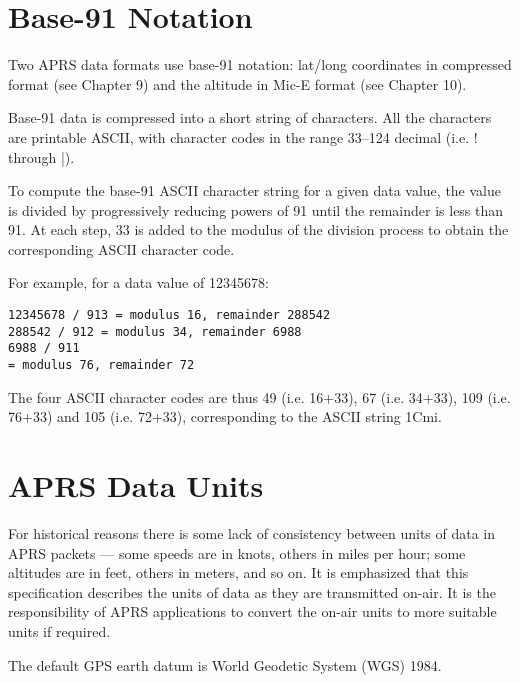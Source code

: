 \section{Base-91 Notation}

Two APRS data formats use base-91 notation: lat/long coordinates in
compressed format (see Chapter 9) and the altitude in Mic-E format (see
Chapter 10).

Base-91 data is compressed into a short string of characters. All the
characters are printable ASCII, with character codes in the range 33–124
decimal (i.e. ! through |).

To compute the base-91 ASCII character string for a given data value, the
value is divided by progressively reducing powers of 91 until the remainder
is less than 91. At each step, 33 is added to the modulus of the division
process to obtain the corresponding ASCII character code.

For example, for a data value of 12345678:
\begin{verbatim}
12345678 / 913 = modulus 16, remainder 288542
288542 / 912 = modulus 34, remainder 6988
6988 / 911
= modulus 76, remainder 72
\end{verbatim}

The four ASCII character codes are thus 49 (i.e. 16+33), 67 (i.e. 34+33), 109
(i.e. 76+33) and 105 (i.e. 72+33), corresponding to the ASCII string 1Cmi.

\section{APRS Data Units}

For historical reasons there is some lack of consistency between units of data
in APRS packets — some speeds are in knots, others in miles per hour; some
altitudes are in feet, others in meters, and so on. It is emphasized that this
specification describes the units of data as they are transmitted on-air. It is
the responsibility of APRS applications to convert the on-air units to more
suitable units if required.

The default GPS earth datum is World Geodetic System (WGS) 1984.


